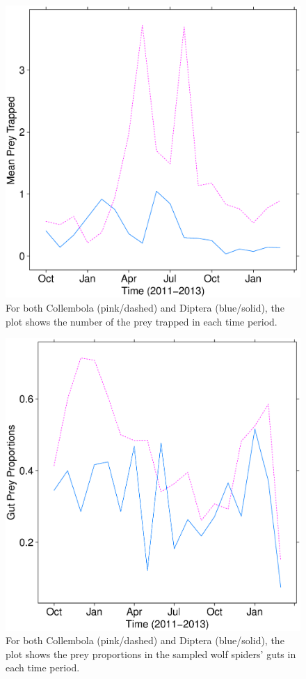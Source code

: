 \documentclass[smallextended]{svjour3}
\begin{document}
\begin{figure}
  \centering
  \includegraphics[scale=0.35]{prey_trapped}
  \caption{For both Collembola (pink/dashed) and Diptera (blue/solid), the plot shows the number of the prey trapped in each time period.}
  \label{fig:trapped}
\end{figure}

\begin{figure}
  \centering
  \includegraphics[scale=0.35]{prey_props}
  \caption{For both Collembola (pink/dashed) and Diptera (blue/solid), the plot shows the prey proportions in the sampled wolf spiders' guts in each time period.}
  \label{fig:props}
\end{figure}
\end{document}
